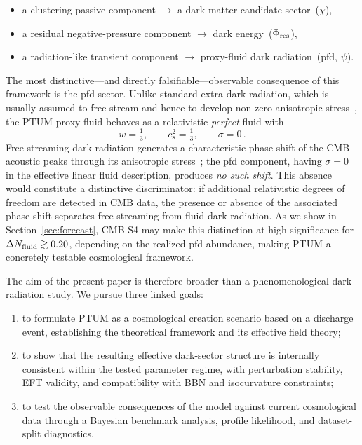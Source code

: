 \documentclass[epj]{svjour}
\begin{document}
\begin{itemize}
\item a clustering passive component $\rightarrow$ a dark-matter candidate sector~($\chi$),
\item a residual negative-pressure component $\rightarrow$
      dark energy~($\Phi_{\rm res}$),
\item a radiation-like transient component $\rightarrow$
      proxy-fluid dark radiation~(pfd, $\psi$).
\end{itemize}

The most distinctive---and directly falsifiable---observable
consequence of this framework is the pfd sector. Unlike standard
extra dark radiation, which is usually assumed to free-stream and
hence to develop non-zero anisotropic
stress~\cite{Bashinsky2004,Baumann2016,Follin2015}, the PTUM
proxy-fluid behaves as a relativistic \emph{perfect} fluid with
\begin{equation}
w = \tfrac{1}{3},\qquad
c_s^{2} = \tfrac{1}{3},\qquad
\sigma = 0\,.
\label{eq:pfd_signature}
\end{equation}
Free-streaming dark radiation generates a characteristic phase shift
of the CMB acoustic peaks through its anisotropic
stress~\cite{Bashinsky2004,Baumann2016,Follin2015}; the pfd
component, having $\sigma=0$ in the effective linear fluid description,
produces \emph{no such shift}. This absence would constitute a
distinctive discriminator: if additional relativistic degrees of freedom
are detected in CMB data, the presence or absence of the associated
phase shift separates free-streaming from fluid dark radiation. As we
show in Section~\ref{sec:forecast}, CMB-S4 may make this distinction
at high significance for $\Delta N_{\rm fluid}\gtrsim 0.20$,
depending on the realized pfd abundance, making PTUM a concretely
testable cosmological framework.

The aim of the present paper is therefore broader than a
phenomenological dark-radiation study. We pursue three linked goals:

\begin{enumerate}[label=(\roman*)]
\item to formulate PTUM as a cosmological creation scenario based on
      a discharge event, establishing the theoretical framework and
      its effective field theory;
\item to show that the resulting effective dark-sector structure is
      internally consistent within the tested parameter regime, with
      perturbation stability, EFT validity, and compatibility with
      BBN and isocurvature constraints;
\item to test the observable consequences of the model against
      current cosmological data through a Bayesian benchmark analysis,
      profile likelihood, and dataset-split diagnostics.
\end{enumerate}
\end{document}

